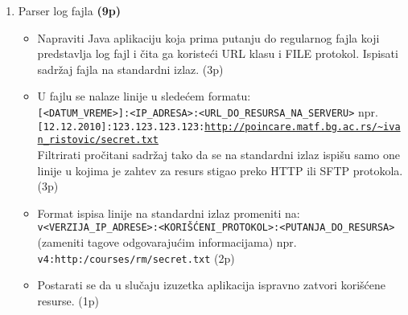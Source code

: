 \documentclass[]{article}
\begin{document}
\begin{enumerate}
  \item Parser log fajla \textbf{(9p)}
  \begin{itemize}
    \item Napraviti Java aplikaciju koja prima putanju do regularnog fajla koji predstavlja log fajl i \v{c}ita ga koriste\'c{}i URL klasu i FILE protokol. Ispisati sadr\v{z}aj fajla na standardni izlaz. \hfill (3p)
    \item U fajlu se nalaze linije u slede\'c{}em formatu:\\
    \texttt{[<DATUM\_VREME>]:<IP\_ADRESA>:<URL\_DO\_RESURSA\_NA\_SERVERU>} npr.\\
    \texttt{[12.12.2010]:123.123.123.123:\url{http://poincare.matf.bg.ac.rs/~ivan_ristovic/secret.txt}}\\
    Filtrirati pro\v{c}itani sadr\v{z}aj tako da se na standardni izlaz ispi\v{s}u samo one linije u kojima je zahtev za resurs stigao preko HTTP ili SFTP protokola. \hfill (3p)
    \item Format ispisa linije na standardni izlaz promeniti na:\\
    \texttt{v<VERZIJA\_IP\_ADRESE>:<KORI\v{S}\'C{}ENI\_PROTOKOL>:<PUTANJA\_DO\_RESURSA>} (zameniti tagove odgovaraju\'c{}im informacijama) npr.\\
    \texttt{v4:http:/courses/rm/secret.txt} \hfill (2p)
    \item Postarati se da u slu\v{c}aju izuzetka aplikacija ispravno zatvori kori\v{s}\'c{}ene resurse. \hfill (1p)
  \end{itemize}
\end{enumerate}
\end{document}
